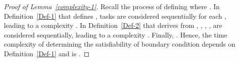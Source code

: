 \documentclass[10pt,journal,compsoc]{IEEEtran}
\begin{document}
\begin{proof}[Proof of Lemma~\ref{complexity-1}]
Recall the process of defining  where . In Definition~\ref{Def-1} that defines ,  tasks are considered sequentially for each , leading to a complexity . In Definition~\ref{Def-2} that derives  from , , , ,  are considered sequentially, leading to a complexity . Finally, . Hence, the time complexity of determining the satisfiability of boundary condition depends on Definition~\ref{Def-1} and is .
\end{proof}
\end{document}
